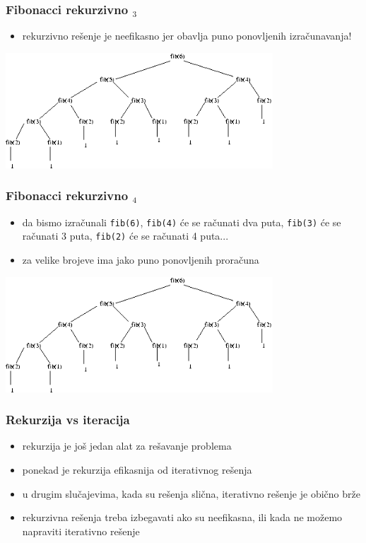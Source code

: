 \documentclass[utf8,compress,aspectratio=169]{beamer}
\begin{document}
\begin{frame}[fragile]
  \frametitle{Fibonacci rekurzivno $_3$}
  \begin{itemize}
    \item rekurzivno rešenje je neefikasno jer obavlja puno ponovljenih izračunavanja!
  \end{itemize}
\begin{center}
  \includegraphics[width=10cm]{pic27}
\end{center}
\end{frame}

\begin{frame}[fragile]
  \frametitle{Fibonacci rekurzivno $_4$}
  \begin{itemize}
    \item da bismo izračunali \texttt{fib(6)}, \texttt{fib(4)} će se računati dva puta,
      \texttt{fib(3)} će se računati 3 puta, \texttt{fib(2)} će se računati 4 puta...
    \item za velike brojeve ima jako puno ponovljenih proračuna
  \end{itemize}
\begin{center}
  \includegraphics[width=10cm]{pic27}
\end{center}
\end{frame}

\begin{frame}[fragile]
  \frametitle{Rekurzija vs iteracija}
  \begin{itemize}
    \item rekurzija je još jedan alat za rešavanje problema
    \item ponekad je rekurzija efikasnija od iterativnog rešenja
    \item u drugim slučajevima, kada su rešenja slična, iterativno rešenje je obično brže
    \item rekurzivna rešenja treba izbegavati ako su neefikasna, ili kada ne možemo napraviti iterativno rešenje
  \end{itemize}
\end{frame}
\end{document}
